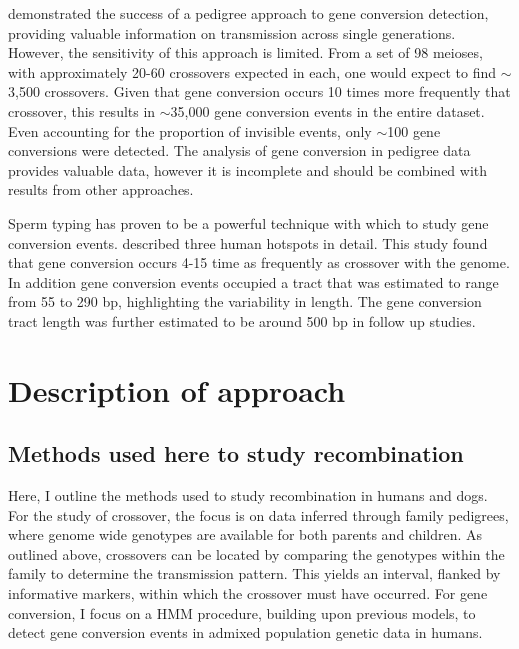 \citet{Williams2015} demonstrated the success of a pedigree approach to gene conversion detection, providing valuable information on transmission across single generations.
However, the sensitivity of this approach is limited.
From a set of 98 meioses, with approximately 20-60 crossovers expected in each, one would expect to find $\sim$3,500 crossovers.
Given that gene conversion occurs 10 times more frequently that crossover\cite{Jeffreys2004,Baudat2007,Cole2012}, this results in $\sim$35,000 gene conversion events in the entire dataset.
Even accounting for the proportion of invisible events, only $\sim$100 gene conversions were detected.
The analysis of gene conversion in pedigree data provides valuable data, however it is incomplete and should be combined with results from other approaches.


Sperm typing has proven to be a powerful technique with which to study gene conversion events.
\citet{Jeffreys2004} described three human hotspots in detail.
This study found that gene conversion occurs 4-15 time as frequently as crossover with the genome.
In addition gene conversion events occupied a tract that was estimated to range from 55 to 290 bp, highlighting the variability in length.
The gene conversion tract length was further estimated to be around 500 bp\cite{Cole2012} in follow up studies.




\section{Description of approach}

\subsection{Methods used here to study recombination}
Here, I outline the methods used to study recombination in humans and dogs.
For the study of crossover, the focus is on data inferred through family pedigrees, where genome wide genotypes are available for both parents and children.
As outlined above, crossovers can be located by comparing the genotypes within the family to determine the transmission pattern.
This yields an interval, flanked by informative markers, within which the crossover must have occurred.
For gene conversion, I focus on a HMM procedure, building upon previous models, to detect gene conversion events in admixed population genetic data in humans.



